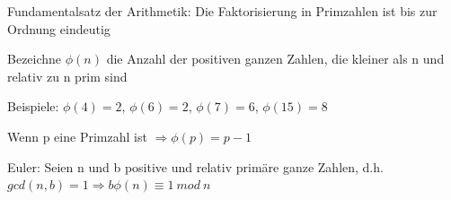 \documentclass[a4paper]{article}
\begin{document}
\begin{multicols}{3}
\begin{itemize*}
            \item Fundamentalsatz der Arithmetik: Die Faktorisierung in Primzahlen ist bis zur Ordnung eindeutig
            \item Bezeichne $\phi(n)$ die Anzahl der positiven ganzen Zahlen, die kleiner als n und relativ zu n prim sind
            \begin{itemize*}
                  \item Beispiele: $\phi(4) = 2$, $\phi(6)=2$, $\phi(7)=6$, $\phi(15)=8$
                  \item Wenn p eine Primzahl ist $\Rightarrow\phi(p)=p-1$
            \end{itemize*}
            \item Euler: Seien n und b positive und relativ primäre ganze Zahlen, d.h. $gcd(n, b) = 1 \Rightarrow b \phi(n) \equiv 1\ mod\ n$
            \begin{itemize*}

\end{itemize*}
\end{itemize*}
\end{multicols}
\end{document}
